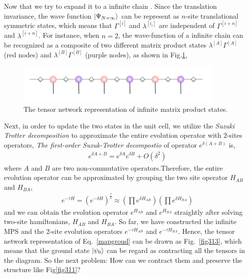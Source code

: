 Now that we try to expand it to a infinite chain \cite{PhysRevLett.98.070201}. Since the translation invariance, the wave function $\Ket{\Psi_{N=\infty}}$ can be represent as $n$-site translational symmetric states, which means that $\Gamma^{[i]}$ and $\lambda^{[i_{i}]}$ are independent of $\Gamma^{[i+n]}$ and $\lambda^{[i+n]}$. For instance, when $n=2$, the wave-function of a infinite chain can be recognized as a composite of two different matrix product states $\lambda^{[A]}\Gamma^{[A]}$ (red nodes) and $\lambda^{[B]}\Gamma^{[B]}$ (purple nodes), as shown in Fig.\ref{fig312}, 

\begin{figure}[ht]
	\centering
	\includegraphics[width=0.90\textwidth]{figures/fig311.png}
	\caption[The tensor network representation of infinite matrix product states]{The tensor network representation of infinite matrix product states.}
	\label{fig312}
\end{figure}

Next, in order to update the two states in the unit cell, we utilize the \textit{Suzuki Trotter decomposition} to approximate the entire evolution operator with $2$-sites operators, \textit{The first-order Suzuk-Trotter decompostio} of operator $e^{\delta (A+B)}$ is,
\begin{align}
	\label{STd}
	e^{\delta A + B} = e^{\delta A}e^{\delta B} + O(\delta^2)
\end{align}
where $A$ and $B$ are two non-commutative operators.Therefore, the entire evolution operator can be approximated by grouping the two site operator $H_{AB}$ and $H_{BA}$,
\begin{align}
	\label{evoopt}
	e^{-\tau H} = \left(e^{-\delta H}\right)^{\frac{\tau}{\delta}} \approx \left(\prod e^{\delta H_{AB}} \right)\left( \prod e^{\delta H_{BA}}\right)
\end{align}
and we can obtain the evolution operator $e^{H_{AB}}$ and $e^{H_{BA}}$ straightly after solving two-site hamiltonians, $H_{AB}$ and $H_{BA}$.
So far, we have constructed the infinite MPS and the 2-site evolution operators $e^{-\tau H_{AB}}$ and $e^{-\tau H_{BA}}$. Hence, the tensor network representation of Eq.~\ref{mapgroud} can be drawn as Fig.~\ref{fig313}, which means that the ground state $\Ket{\psi_0}$ can be regard as contracting all the tensors in the diagram. So the next problem: How can we contract them and preserve the structure like Fig{\ref{fig311}}?

